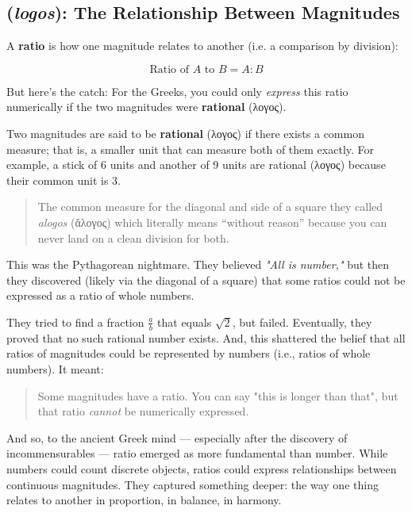 \subsection{(\textit{logos}): The Relationship Between Magnitudes}

A \textbf{ratio} is how one magnitude relates to another (i.e. a comparison by division):

\[
\text{Ratio of } A \text{ to } B = A : B
\]

But here's the catch: For the Greeks, you could only \emph{express} this ratio numerically if the two magnitudes were \textbf{rational} (\textgreek{λογος}).

Two magnitudes are said to be \textbf{rational} (\textgreek{λογος}) if there exists a common measure; that is, a smaller unit that can measure both of them exactly. For example, a stick of 6 units and another of 9 units are rational (\textgreek{λογος}) because their common unit is 3.

\begin{quote}
The common measure for the diagonal and side of a square they called \textit{alogos} (\textgreek{ἄλογος}) which literally means ``without reason'' because you can never land on a clean division for both.
\end{quote}

This was the Pythagorean nightmare. They believed \textit{"All is number,"} but then they discovered (likely via the diagonal of a square) that some ratios could not be expressed as a ratio of whole numbers.

They tried to find a fraction \( \frac{a}{b} \) that equals \( \sqrt{2} \), but failed. Eventually, they proved that no such rational number exists.  And, this shattered the belief that all ratios of magnitudes could be represented by numbers (i.e., ratios of whole numbers).  It meant:

\begin{quote}
Some magnitudes have a ratio. You can say "this is longer than that", but that ratio \emph{cannot} be numerically expressed.
\end{quote}

And so, to the ancient Greek mind — especially after the discovery of incommensurables — ratio emerged as more fundamental than number. While numbers could count discrete objects, ratios could express relationships between continuous magnitudes. They captured something deeper: the way one thing relates to another in proportion, in balance, in harmony.

